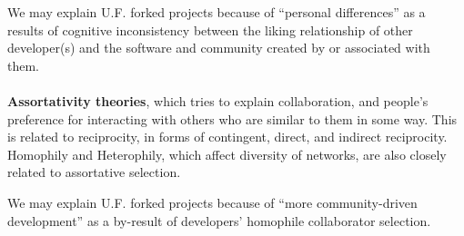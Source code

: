 \documentclass[11pt]{report}
\begin{document}
We may explain U.F. forked projects because of ``personal differences'' as a results of cognitive inconsistency between the liking relationship of other developer(s) and the software and community created by or associated with them. 

\paragraph{} \textbf{Assortativity theories}, which tries to explain collaboration, and people's preference for interacting with others who are similar to them in some way. This is related to reciprocity, in forms of contingent, direct, and indirect reciprocity. Homophily and Heterophily, which affect diversity of networks, are also closely related to assortative selection.

We may explain U.F. forked projects because of ``more community-driven development'' as a by-result of developers' homophile collaborator selection.
\end{document}
